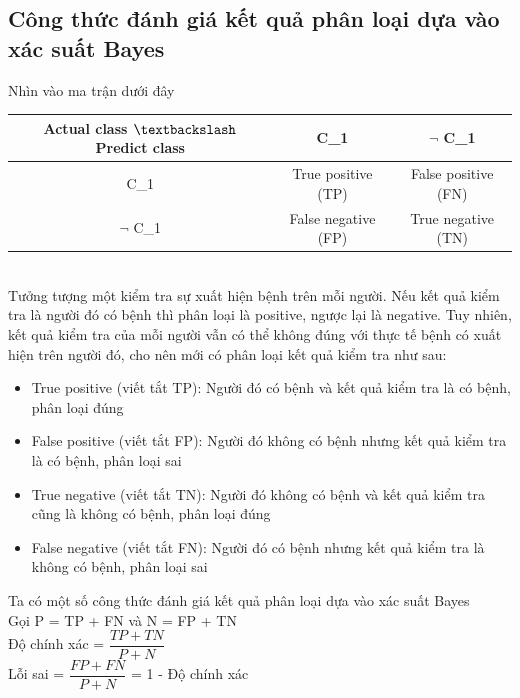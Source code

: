 \documentclass[a4paper, 13pt]{report}
\begin{document}
\subsection*{Công thức đánh giá kết quả phân loại dựa vào xác suất Bayes}
Nhìn vào ma trận dưới đây\\
\begin{tabular}{ |c|c|c| }
\hline
Actual class $\textbackslash$ Predict class & C\_1 & $\neg$ C\_1 \\
\hline
C\_1 & True positive (TP) & False positive (FN)\\
\hline
$\neg$ C\_1 & False negative (FP) & True negative (TN)\\
\hline
\end{tabular}\\
Tưởng tượng một kiểm tra sự xuất hiện bệnh trên mỗi người. Nếu kết quả kiểm tra là người đó có bệnh thì phân loại là positive, ngược lại là negative. Tuy nhiên, kết quả kiểm tra của mỗi người vẫn có thể không đúng với thực tế bệnh có xuất hiện trên người đó, cho nên mới có phân loại kết quả kiểm tra như sau: 
\begin{itemize}
\item True positive (viết tắt TP): Người đó có bệnh và kết quả kiểm tra là có bệnh, phân loại đúng
\item False positive (viết tắt FP): Người đó không có bệnh nhưng kết quả kiểm tra là có bệnh, phân loại sai
\item True negative (viết tắt TN): Người đó không có bệnh và kết quả kiểm tra cũng là không có bệnh, phân loại đúng
\item False negative (viết tắt FN): Người đó có bệnh nhưng kết quả kiểm tra là không có bệnh, phân loại sai
\end{itemize}     
Ta có một số công thức đánh giá kết quả phân loại dựa vào xác suất Bayes\\
Gọi P = TP + FN và N = FP + TN\\
Độ chính xác = $\dfrac{TP+TN}{P+N}$\\
Lỗi sai = $\dfrac{FP+FN}{P+N}$ = 1 - Độ chính xác
\end{document}
